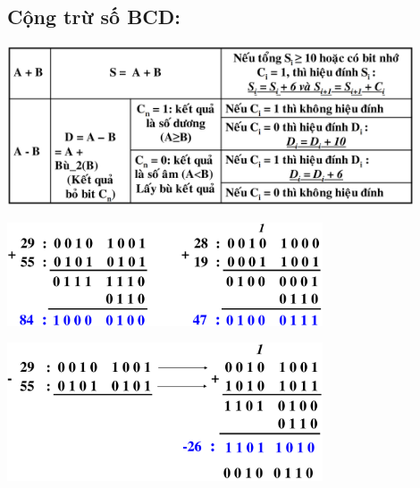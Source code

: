 \subsection{Cộng trừ số BCD:}
\begin{center}
    \includegraphics[width = 0.9\textwidth]{./local/image/19.png}
\end{center}
\begin{center}
    \includegraphics[width = 0.7\textwidth]{./local/image/14.png}
\end{center}
\begin{center}
    \includegraphics[width = 0.7\textwidth]{./local/image/15.png}
\end{center}